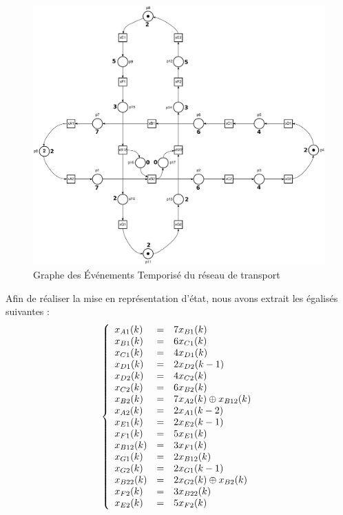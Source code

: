 \begin{figure}[!ht]
\centering
\includegraphics[width =.8 \textwidth]{./I/images/train.pdf}
\caption{\label{fig:get_train} Graphe des Événements Temporisé du réseau de transport}
\end{figure}
Afin de réaliser la mise en représentation d'état, nous avons extrait les égalisés suivantes :
\begin{equation}
\label{equ:ee1}
\left\lbrace
\begin{array}{l c l}
x_{A1}(k) &=&	7x_{B1}(k)\\ 
x_{B1}(k) &=&	6x_{C1}(k)\\
x_{C1}(k) &=& 	4x_{D1}(k)\\
x_{D1}(k) &=&	2x_{D2}(k-1)\\
x_{D2}(k) &=&	4x_{C2}(k)\\
x_{C2}(k) &=&	6x_{B2}(k)\\
x_{B2}(k) &=&	7x_{A2}(k) \oplus x_{B12}(k)\\
x_{A2}(k) &=&	2x_{A1}(k-2)\\
x_{E1}(k) &=&	2x_{E2}(k-1)\\
x_{F1}(k) &=&	5x_{E1}(k)\\
x_{B12}(k) &=&	3x_{F1}(k)\\
x_{G1}(k) &=&	2x_{B12}(k)\\
x_{G2}(k) &=&	2x_{G1}(k-1)\\
x_{B22}(k) &=&	2x_{G2}(k) \oplus x_{B2}(k)\\
x_{F2}(k) &=&	3x_{B22}(k)\\
x_{E2}(k) &=&	5x_{F2}(k)   \\  
\end{array}
\right. 
\end{equation}

